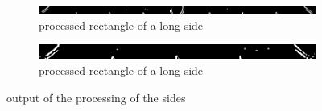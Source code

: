 \begin{figure}
    \centering
    \begin{subfigure}[b]{\textwidth}
    \includegraphics[width=\textwidth]{./imgs/sobel_long_side.png}
    \caption{processed rectangle of a long side}\par
    \end{subfigure}\vspace{10}
    \begin{subfigure}[b]{\textwidth}
    \includegraphics[width=\textwidth]{./imgs/sobel_short_side.png}
    \caption{processed rectangle of a long side}
    \end{subfigure}
    \caption{output of the processing of the sides}
    \label{fig:sidestabol}
\end{figure}
